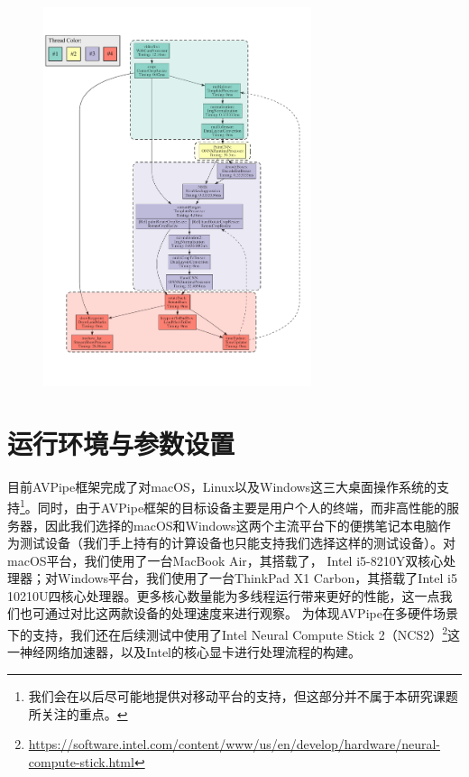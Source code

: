 \begin{figure}[!bt]
    \centering
    \includegraphics[width=0.7\textwidth]{figure/AVP_multi_hand_tracking.pdf}
    \label{fig:hand_dag}
\end{figure}

\section{运行环境与参数设置}
目前AVPipe框架完成了对macOS，Linux以及Windows这三大桌面操作系统的支持\footnote{我们会在以后尽可能地提供对移动平台的支持，但这部分并不属于本研究课题所关注的重点。}。同时，由于AVPipe框架的目标设备主要是用户个人的终端，而非高性能的服务器，因此我们选择的macOS和Windows这两个主流平台下的便携笔记本电脑作为测试设备（我们手上持有的计算设备也只能支持我们选择这样的测试设备）。对macOS平台，我们使用了一台MacBook Air，其搭载了，
Intel i5-8210Y双核心处理器；对Windows平台，我们使用了一台ThinkPad X1 Carbon，其搭载了Intel i5 10210U四核心处理器。更多核心数量能为多线程运行带来更好的性能，这一点我们也可通过对比这两款设备的处理速度来进行观察。
为体现AVPipe在多硬件场景下的支持，我们还在后续测试中使用了Intel Neural Compute Stick 2（NCS2）\footnote{\url{https://software.intel.com/content/www/us/en/develop/hardware/neural-compute-stick.html}}这一神经网络加速器，以及Intel的核心显卡进行处理流程的构建。\par

